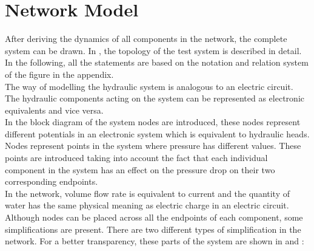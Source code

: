 \section{Network Model}  
\label{SystemModel}

After deriving the dynamics of all components in the network, the complete system can be drawn. In , the topology of the test system is described in detail. In the following, all the statements are based on the notation and relation system of the figure in the appendix. 
\\
The way of modelling the hydraulic system is analogous to an electric circuit. The hydraulic components acting on the system can be represented as electronic equivalents and vice versa. 
\\
In the block diagram of the system nodes are introduced, these nodes represent different potentials in an electronic system which is equivalent to hydraulic heads. Nodes represent points in the system where pressure has different values. These points are introduced taking into account the fact that each individual component in the system has an effect on the pressure drop on their two corresponding endpoints. %
\\
In the network, volume flow rate is equivalent to current and the quantity of water has the same physical meaning as electric charge in an electric circuit. 
\\ 
Although nodes can be placed across all the endpoints of each component, some simplifications are present. There are two different types of simplification in the network. For a better transparency, these parts of the system are shown in  and : 


\begin{figure}[H]
\centering
\begin{minipage}{0.4\textwidth}
  \centering
   
  \label{fig:subsys_1}
\end{minipage}%
\begin{minipage}{0.4\textwidth}
  \centering
   
  \label{fig:subsys_2}
\end{minipage}
\end{figure}

